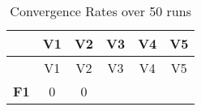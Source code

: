 \documentclass[12pt,a4paper]{article}
\begin{document}
\begin{longtable}[c]{@{}cccccc@{}}
\caption{Convergence Rates over 50 runs}\tabularnewline
\toprule
\begin{minipage}[b]{0.12\columnwidth}\centering\strut
~
\strut\end{minipage} &
\begin{minipage}[b]{0.06\columnwidth}\centering\strut
V1
\strut\end{minipage} &
\begin{minipage}[b]{0.06\columnwidth}\centering\strut
V2
\strut\end{minipage} &
\begin{minipage}[b]{0.06\columnwidth}\centering\strut
V3
\strut\end{minipage} &
\begin{minipage}[b]{0.06\columnwidth}\centering\strut
V4
\strut\end{minipage} &
\begin{minipage}[b]{0.06\columnwidth}\centering\strut
V5
\strut\end{minipage}\tabularnewline
\midrule
\endfirsthead
\toprule
\begin{minipage}[b]{0.12\columnwidth}\centering\strut
~
\strut\end{minipage} &
\begin{minipage}[b]{0.06\columnwidth}\centering\strut
V1
\strut\end{minipage} &
\begin{minipage}[b]{0.06\columnwidth}\centering\strut
V2
\strut\end{minipage} &
\begin{minipage}[b]{0.06\columnwidth}\centering\strut
V3
\strut\end{minipage} &
\begin{minipage}[b]{0.06\columnwidth}\centering\strut
V4
\strut\end{minipage} &
\begin{minipage}[b]{0.06\columnwidth}\centering\strut
V5
\strut\end{minipage}\tabularnewline
\midrule
\endhead
\begin{minipage}[t]{0.12\columnwidth}\centering\strut
\textbf{F1}
\strut\end{minipage} &
\begin{minipage}[t]{0.06\columnwidth}\centering\strut
0
\strut\end{minipage} &
\begin{minipage}[t]{0.06\columnwidth}\centering\strut
0
\strut\end{minipage} &

\end{longtable}
\end{document}
